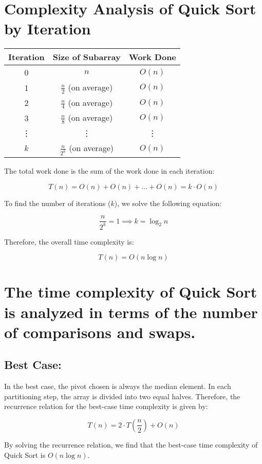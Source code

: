 \documentclass[twocolumn]{article}
\begin{document}
  \section*{Complexity Analysis of Quick Sort by Iteration}

\begin{center}
\begin{tabular}{|c|c|c|}
\hline
\textbf{Iteration} & \textbf{Size of Subarray} & \textbf{Work Done } \\
\hline
0 & $n$ & $O(n)$ \\
1 & $\frac{n}{2}$ (on average) & $O(n)$ \\
2 & $\frac{n}{4}$ (on average) & $O(n)$ \\
3 & $\frac{n}{8}$ (on average) & $O(n)$ \\
\vdots & \vdots & \vdots \\
$k$ & $\frac{n}{2^k}$ (on average) & $O(n)$ \\
\hline
\end{tabular}
\end{center}

The total work done is the sum of the work done in each iteration:

\[
T(n) = O(n) + O(n) + \ldots + O(n) = k \cdot O(n)
\]

To find the number of iterations ($k$), we solve the following equation:

\[
\frac{n}{2^k} = 1 \implies k = \log_2 n
\]

Therefore, the overall time complexity is:

\[
T(n) = O(n \log n)
\]
\section*{The time complexity of Quick Sort is analyzed in terms of the number of comparisons and swaps.
}
\subsection*{Best Case:}

In the best case, the pivot chosen is always the median element. In each partitioning step, the array is divided into two equal halves. Therefore, the recurrence relation for the best-case time complexity is given by:

\[
T(n) = 2 \cdot T\left(\frac{n}{2}\right) + O(n)
\]

By solving the recurrence relation, we find that the best-case time complexity of Quick Sort is $O(n \log n)$.
\end{document}

